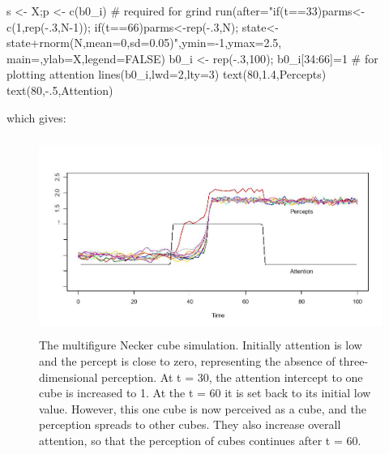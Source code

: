 \documentclass[
  letterpaper,
]{scrbook}
\newenvironment{Shaded}{\begin{snugshade}}{\end{snugshade}}
\newcommand{\AttributeTok}[1]{\textcolor[rgb]{0.40,0.45,0.13}{#1}}
\newcommand{\CommentTok}[1]{\textcolor[rgb]{0.37,0.37,0.37}{#1}}
\newcommand{\ConstantTok}[1]{\textcolor[rgb]{0.56,0.35,0.01}{#1}}
\newcommand{\DecValTok}[1]{\textcolor[rgb]{0.68,0.00,0.00}{#1}}
\newcommand{\FloatTok}[1]{\textcolor[rgb]{0.68,0.00,0.00}{#1}}
\newcommand{\FunctionTok}[1]{\textcolor[rgb]{0.28,0.35,0.67}{#1}}
\newcommand{\NormalTok}[1]{\textcolor[rgb]{0.00,0.23,0.31}{#1}}
\newcommand{\OtherTok}[1]{\textcolor[rgb]{0.00,0.23,0.31}{#1}}
\newcommand{\SpecialCharTok}[1]{\textcolor[rgb]{0.37,0.37,0.37}{#1}}
\newcommand{\StringTok}[1]{\textcolor[rgb]{0.13,0.47,0.30}{#1}}
\begin{document}
\begin{Shaded}
\begin{Highlighting}[]
\NormalTok{s }\OtherTok{\textless{}{-}}\NormalTok{ X;p }\OtherTok{\textless{}{-}} \FunctionTok{c}\NormalTok{(b0\_i) }\CommentTok{\# required for grind}
\FunctionTok{run}\NormalTok{(}\AttributeTok{after=}\StringTok{"if(t==33)parms\textless{}{-}c(1,rep({-}.3,N{-}1));}
\StringTok{           if(t==66)parms\textless{}{-}rep({-}.3,N);}
\StringTok{           state\textless{}{-}state+rnorm(N,mean=0,sd=0.05)"}\NormalTok{,}\AttributeTok{ymin=}\SpecialCharTok{{-}}\DecValTok{1}\NormalTok{,}\AttributeTok{ymax=}\FloatTok{2.5}\NormalTok{,}
            \AttributeTok{main=}\StringTok{\textquotesingle{}\textquotesingle{}}\NormalTok{,}\AttributeTok{ylab=}\StringTok{\textquotesingle{}X\textquotesingle{}}\NormalTok{,}\AttributeTok{legend=}\ConstantTok{FALSE}\NormalTok{)}
\NormalTok{b0\_i }\OtherTok{\textless{}{-}} \FunctionTok{rep}\NormalTok{(}\SpecialCharTok{{-}}\NormalTok{.}\DecValTok{3}\NormalTok{,}\DecValTok{100}\NormalTok{); b0\_i[}\DecValTok{34}\SpecialCharTok{:}\DecValTok{66}\NormalTok{]}\OtherTok{=}\DecValTok{1} \CommentTok{\# for plotting attention}
\FunctionTok{lines}\NormalTok{(b0\_i,}\AttributeTok{lwd=}\DecValTok{2}\NormalTok{,}\AttributeTok{lty=}\DecValTok{3}\NormalTok{)}
\FunctionTok{text}\NormalTok{(}\DecValTok{80}\NormalTok{,}\FloatTok{1.4}\NormalTok{,}\StringTok{\textquotesingle{}Percepts\textquotesingle{}}\NormalTok{)}
\FunctionTok{text}\NormalTok{(}\DecValTok{80}\NormalTok{,}\SpecialCharTok{{-}}\NormalTok{.}\DecValTok{5}\NormalTok{,}\StringTok{\textquotesingle{}Attention\textquotesingle{}}\NormalTok{)}
\end{Highlighting}
\end{Shaded}

which gives:

\begin{figure}

{\centering \includegraphics[width=5.27694in,height=2.52858in]{media/ch5/image19.jpg}

}

\caption{\label{fig-ch5-img19-old-67}The multifigure Necker cube
simulation. Initially attention is low and the percept is close to zero,
representing the absence of three-dimensional perception. At t = 30, the
attention intercept to one cube is increased to 1. At the t = 60 it is
set back to its initial low value. However, this one cube is now
perceived as a cube, and the perception spreads to other cubes. They
also increase overall attention, so that the perception of cubes
continues after t = 60.}

\end{figure}
\end{document}
